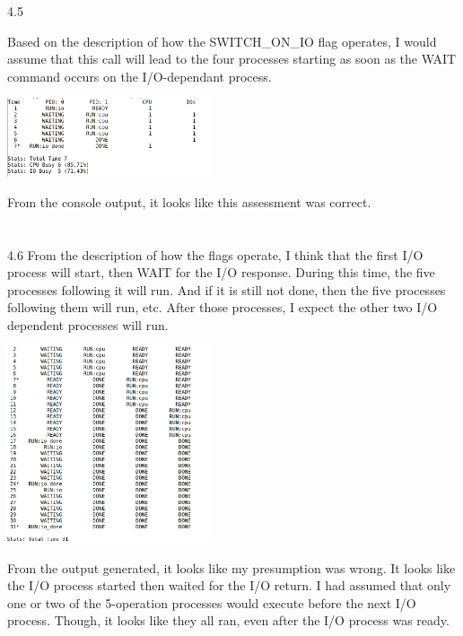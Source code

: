 \documentclass[12pt, a4paper]{article}
\begin{document}
4.5

	Based on the description of how the SWITCH\_ON\_IO flag operates, I would assume that this call will lead to the four processes starting as soon as the WAIT command occurs on the I/O-dependant process.
	
	\begin{center}
	\includegraphics[width=6cm]{hw1_4_5.png}\\
	\end{center}

	From the console output, it looks like this assessment was correct. \\ \\ \\
	
4.6
	From the description of how the flags operate, I think that the first I/O process will start, then WAIT for the I/O response. During this time, the five processes following it will run. And if it is still not done, then the five processes following them will run, etc. After those processes, I expect the other two I/O dependent processes will run. 
	
	
	\begin{center}
	\includegraphics[width=6cm]{hw1_4_6.png}\\
	\end{center}

	From the output generated, it looks like my presumption was wrong. It looks like the I/O process started then waited for the I/O return. I had assumed that only one or two of the 5-operation processes would execute before the next I/O process. Though, it looks like they all ran, even after the I/O process was ready. 
	
\end{document}
